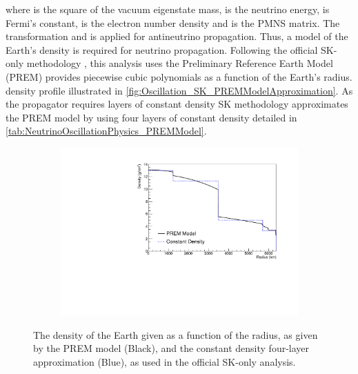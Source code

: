 where  is the square of the  vacuum eigenstate mass,  is the neutrino energy,  is Fermi's constant,  is the electron number density and  is the PMNS matrix. The transformation  and  is applied for antineutrino propagation. Thus, a model of the Earth's density is required for  neutrino propagation. Following the official SK-only methodology \cite{thesis_roger}, this analysis uses the Preliminary Reference Earth Model (PREM) \cite{Dziewonski1981-sp}  provides piecewise cubic polynomials as a function of the Earth's radius.   density profile  illustrated in \autoref{fig:Oscillation_SK_PREMModelApproximation}. As  the propagator requires layers of constant density  SK methodology approximates the PREM model by using four layers of constant density \cite{thesis_roger}\Change{,} detailed in \autoref{tab:NeutrinoOscillationPhysics_PREMModel}.

\begin{figure}[h]
  \begin{subfigure}[t]{0.8\textwidth}
    \includegraphics[width=\textwidth, trim={0mm 0mm 0mm 0mm}, clip,page=1]{Figures/Oscillation/DensityComparison.pdf}
  \end{subfigure}
  \caption{The density of the Earth given as a function of the radius, as given by the PREM model (Black), and the constant density four-layer approximation (Blue), as used in the official SK-only analysis.}
  \label{fig:Oscillation_SK_PREMModelApproximation}
\end{figure}

